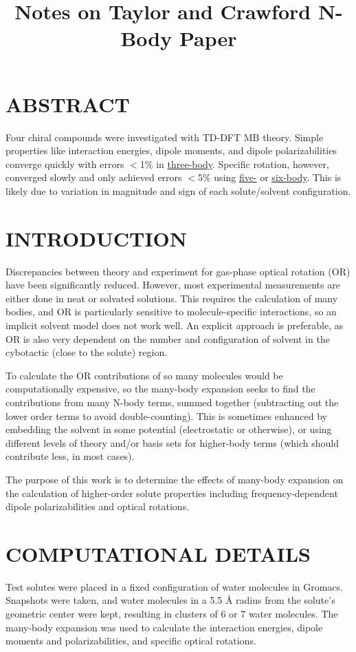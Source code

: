 \documentclass[12pt,a4paper]{article}
\title{Notes on Taylor and Crawford N-Body Paper\cite{Mach2014}}
\begin{document}
	\maketitle
	\section{ABSTRACT}
	 Four chiral compounds were investigated with TD-DFT MB theory. Simple properties like interaction energies, dipole moments, and dipole polarizabilities converge quickly with errors $<$1\% in \underline{three-body}. Specific rotation, however, converged slowly and only achieved errors $<$5\% using \underline{five-} or \underline{six-body}. This is likely due to variation in magnitude and sign of each solute/solvent configuration.
	\section{INTRODUCTION}
	Discrepancies between theory and experiment for gas-phase optical rotation (OR) have been significantly reduced. However, most experimental measurements are either done in neat or solvated solutions. This requires the calculation of many bodies, and OR is particularly sensitive to molecule-specific interactions, so an implicit solvent model does not work well. An explicit approach is preferable, as OR is also very dependent on the number and configuration of solvent in the cybotactic (close to the solute) region.
	
	To calculate the OR contributions of so many molecules would be computationally expensive, so the many-body expansion seeks to find the contributions from many N-body terms, summed together (subtracting out the lower order terms to avoid double-counting). This is sometimes enhanced by embedding the solvent in some potential (electrostatic or otherwise), or using different levels of theory and/or basis sets for higher-body terms (which should contribute less, in most cases). 
	
	The purpose of this work is to determine the effects of many-body expansion on the calculation of higher-order solute properties including frequency-dependent dipole polarizabilities and optical rotations.
	\section{COMPUTATIONAL DETAILS}
	Test solutes were placed in a fixed configuration of water molecules in Gromacs. Snapshots were taken, and water molecules in a 5.5 \AA{} radius from the solute's geometric center were kept, resulting in clusters of 6 or 7 water molecules. The many-body expansion was used to calculate the interaction energies, dipole moments and polarizabilities, and specific optical rotations. 
	
\end{document}
